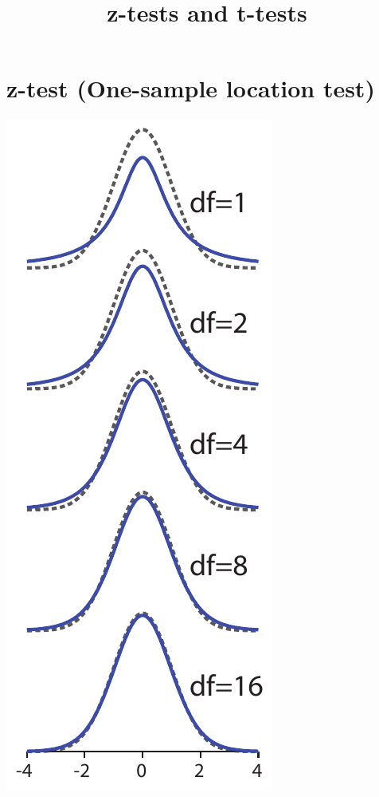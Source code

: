 \documentclass{tufte-handout}
\title{z-tests and t-tests}
\date{} %
\begin{document}
\maketitle%



\section{z-test (One-sample location test)}

\begin{marginfigure}
  \includegraphics[width=\linewidth]{images/handout3_t_vs_norm}%

\end{marginfigure}
\end{document}

